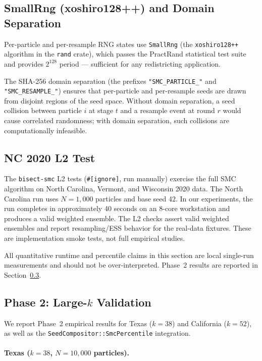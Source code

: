 \subsection{SmallRng (xoshiro128++) and Domain Separation}

Per-particle and per-resample RNG states use \texttt{SmallRng} (the
\texttt{xoshiro128++} algorithm in the \texttt{rand} crate), which passes the
PractRand statistical test suite and provides $2^{128}$ period --- sufficient
for any redistricting application.

The SHA-256 domain separation (the prefixes
\texttt{"SMC\_PARTICLE\_"} and \texttt{"SMC\_RESAMPLE\_"}) ensures that
per-particle and per-resample seeds are drawn from disjoint regions of the
seed space.
Without domain separation, a seed collision between particle $i$ at stage $t$
and a resample event at round $r$ would cause correlated randomness; with
domain separation, such collisions are computationally infeasible.

\subsection{NC 2020 L2 Test}

The \texttt{bisect-smc} L2 tests (\texttt{\#[ignore]}, run manually) exercise
the full SMC algorithm on North Carolina, Vermont, and Wisconsin 2020 data.
The North Carolina run uses $N = 1{,}000$ particles and base seed 42.
In our experiments, the run completes in approximately 40 seconds on an 8-core
workstation and produces a valid weighted ensemble.
The L2 checks assert valid weighted ensembles and report resampling/ESS
behavior for the real-data fixtures. These are implementation smoke tests, not
full empirical studies.

All quantitative runtime and percentile claims in this section are local
single-run measurements and should not be over-interpreted.
Phase~2 results are reported in Section~\ref{sec:phase2}.

\subsection{Phase 2: Large-$k$ Validation}
\label{sec:phase2}

We report Phase~2 empirical results for Texas ($k=38$) and California ($k=52$),
as well as the \texttt{SeedCompositor::SmcPercentile} integration.

\paragraph{Texas ($k = 38$, $N = 10{,}000$ particles).}

